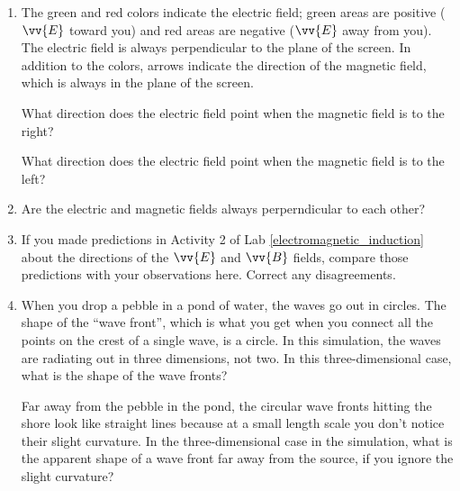 \begin{enumerate}
\item The green and red colors indicate the electric field; green areas are positive 
($\vv{E}$ toward you) and red areas are negative ($\vv{E}$ away from you). 
The electric field is always perpendicular to the plane of the screen.
In addition to the colors, arrows indicate the 
direction of the magnetic field, which is always in the plane of the screen.  

What direction does the electric field point when the magnetic field is to the right?
\vspace{1cm}

What direction does the electric field point when the magnetic field is to the left?
\vspace{1cm}

\item Are the electric and magnetic fields always perperndicular to each other?
\vspace{1.0cm}


\item If you made predictions in Activity 2 of Lab \ref{electromagnetic_induction} about the directions of the $\vv {E}$ 
and $\vv {B}$ fields, compare those predictions with your observations here. Correct any disagreements.
\vspace{2.0cm}

\item When you drop a pebble in a pond of water, the waves go out in circles. The shape of the ``wave front'', which is what you get when you connect all the points on the crest of a single wave, is a circle.   In this simulation, the waves are radiating out in three dimensions, not two.  In this three-dimensional case, what is the shape of the wave fronts?
\vspace{1cm}

Far away from the pebble in the pond, the circular wave fronts hitting the shore look like straight lines because at a small length scale you don't notice their slight curvature. In the three-dimensional case in the simulation, what is the apparent shape of a wave front far away from the source, if you ignore the slight curvature?
\vspace{1cm}



\end{enumerate}
